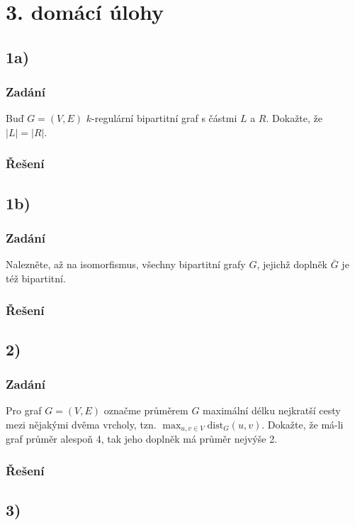 \documentclass[../main.tex]{subfiles}
\begin{document}
\section*{3. domácí úlohy}

\subsection*{1a)}
\subsubsection*{Zadání}
Buď $G=(V,E)$ $k$-regulární bipartitní graf s částmi $L$ a $R$. Dokažte, že $|L|=|R|$.

\subsubsection*{Řešení}


\subsection*{1b)}
\subsubsection*{Zadání}
Nalezněte, až na isomorfismus, všechny bipartitní grafy $G$, jejichž doplněk $\bar{G}$ je též bipartitní.

\subsubsection*{Řešení}


\subsection*{2)}
\subsubsection*{Zadání}
Pro graf $G=(V,E)$ označme průměrem $G$ maximální délku nejkratší cesty mezi nějakými dvěma vrcholy, tzn. $\max_{u,v\in V} \text{dist}_{G}(u,v)$. Dokažte, že má-li graf průměr alespoň 4, tak jeho doplněk má průměr nejvýše 2.

\subsubsection*{Řešení}


\subsection*{3)}
\end{document}
